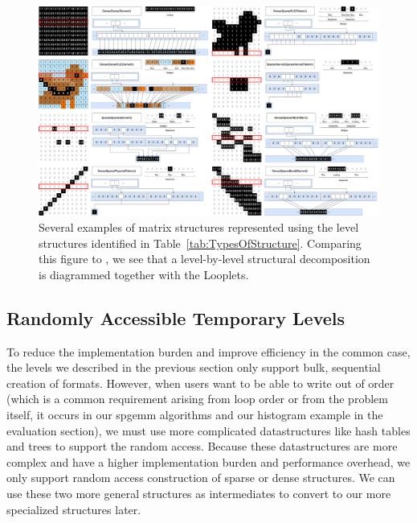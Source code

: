     \begin{figure}
        \centering
        \includegraphics[width=\linewidth]{Structures.png}\hfill%
        \vspace{-8pt}
        \caption{Several examples of matrix structures represented using the
        level structures identified in Table~\ref{tab:TypesOfStructure}.
        Comparing this figure to \cite[Figure 3]{ahrens_looplets_2023}, we see
        that a level-by-level structural decomposition is diagrammed together
        with the Looplets.}
        \label{fig:structuraldiversity}
        \vspace{-18pt}
    \end{figure}

\subsection{Randomly Accessible Temporary Levels}
To reduce the implementation burden and improve efficiency in the common case, the levels we described in the previous section only support bulk,
sequential creation of formats. However, when users want to be able to write out
of order (which is a common requirement arising from loop order or from the
problem itself, it occurs in our spgemm algorithms and our histogram example in
the evaluation section), we must use more complicated datastructures like hash
tables and trees to support the random access. Because these datastructures are
more complex and have a higher implementation burden and performance overhead,
we only support random access construction of sparse or dense structures.  We
can use these two more general structures as intermediates to convert to our
more specialized structures later.


